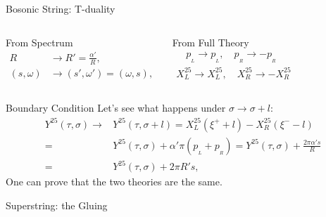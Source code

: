 \begin{frame}{Bosonic String: T-duality}
	\begin{columns}
		\begin{block}{From Spectrum}
			\setlength\abovedisplayskip{0pt}
			\begin{align*}
				R & \to R' = \frac{\alpha'}{R}, \\ (s,\omega) &\to (s',\omega') = (\omega, s) ,
			\end{align*}
		\end{block}
		\begin{block}{From Full Theory}
			\setlength\abovedisplayskip{0pt}
			\begin{gather*}
				\quad p_{\!_L} \to p_{\!_L}, \quad p_{\!_R} \to - p_{\!_R} \\
				X^{25}_L \to X^{25}_L, \quad X^{25}_R \to -X^{25}_R
			\end{gather*}
		\end{block}
	\end{columns}
	\begin{block}{Boundary Condition}
		Let's see what happens under $\sigma \to \sigma +l$:
		\begin{align*}
			Y^{25}(\tau, \sigma) \to &Y^{25}(\tau, \sigma + l) = X^{25}_L (\xi^+ + l) - X^{25}_R(\xi^- - l) \\= &Y^{25}(\tau,\sigma) + \alpha' \pi (p_{\!_L} + p_{\!_R}) = Y^{25}(\tau,\sigma) + \frac{2\pi\alpha' s}{R} \\ = &Y^{25}(\tau,\sigma) + 2\pi R' s ,
		\end{align*}
		One can prove that the two \alert{theories} are the \alert{same}.
	\end{block}
\end{frame}

\begin{frame}{Superstring: the Gluing}
	\begin{table}[c]
		\scalebox{0.79}{
			
		}
	\end{table}
\end{frame}